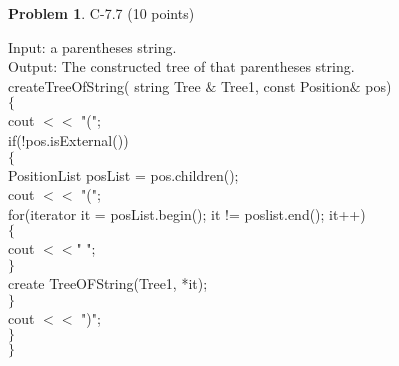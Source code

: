 \documentclass[12pt]{report}
\theoremstyle{definition}
\newtheorem{problem}{Problem}
\begin{document}
\begin{problem} 	C-7.7 (10 points) 		
\end{problem}
				Input: a parentheses string. \\
				Output: The constructed tree of that parentheses string. \\
				createTreeOfString( string Tree $\&$ Tree1, const Position$\&$ pos) \\
				$\{$ \\
				cout $<<$ "("; \\
				if(!pos.isExternal()) \\
				$\{$ \\
				PositionList posList = pos.children(); \\
				cout $<<$ "("; \\
				for(iterator it = posList.begin(); it != poslist.end(); it++) \\
				$\{$ \\
				cout $<<$" "; \\
				$\}$ \\
				create TreeOFString(Tree1, *it); \\
				$\}$ \\ cout $<<$ ")"; \\
				$\}$ \\
				$\}$ \\
				
\goodbreak
\end{document}
